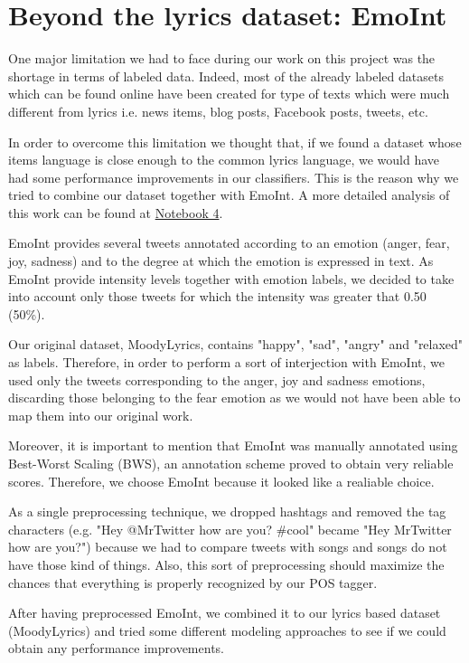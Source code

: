 \section{Beyond the lyrics dataset: EmoInt}

One major limitation we had to face during our work on this project was the shortage in terms of labeled data.
Indeed, most of the already labeled datasets which can be found online have been created for type of texts
which were much different from lyrics i.e. news items, blog posts, Facebook posts, tweets, etc.

In order to overcome this limitation we thought that, if we found a dataset whose items language is close enough
to the common lyrics language, we would have had some performance improvements in our classifiers. This is the
reason why we tried to combine our dataset together with EmoInt\cite{emoint}.
A more detailed analysis of this work can be found at \href{https://github.com/sgiammy/emotion-patterns-in-music-playlists/blob/master/Notebook/4_EmoInt.ipynb}{Notebook 4}.

EmoInt provides several tweets annotated according to an emotion (anger, fear, joy, sadness) and to the degree 
at which the emotion is expressed in text. As EmoInt provide intensity levels together with emotion labels, 
we decided to take into account only those tweets for which the intensity was greater that 0.50 (50\%). 

Our original dataset, MoodyLyrics, contains "happy", "sad", "angry" and "relaxed" as labels. 
Therefore, in order to perform a sort of interjection with EmoInt, we used only the tweets corresponding to the anger, 
joy and sadness emotions, discarding those belonging to the fear emotion as we would not have been able to map them into
our original work.

Moreover, it is important to mention that EmoInt was manually annotated using Best-Worst Scaling (BWS)\cite{bws}, 
an annotation scheme proved to obtain very reliable scores. Therefore, we choose EmoInt because it looked
like a realiable choice.

As a single preprocessing technique, we dropped hashtags and removed the tag characters 
(e.g. "Hey @MrTwitter how are you? \#cool" became "Hey MrTwitter how are you?") because 
we had to compare tweets with songs and songs do not have those kind of things. Also, 
this sort of preprocessing should maximize the chances that everything is properly recognized by our POS tagger.

After having preprocessed EmoInt, we combined it to our lyrics based dataset (MoodyLyrics) and tried some different
modeling approaches to see if we could obtain any performance improvements.

